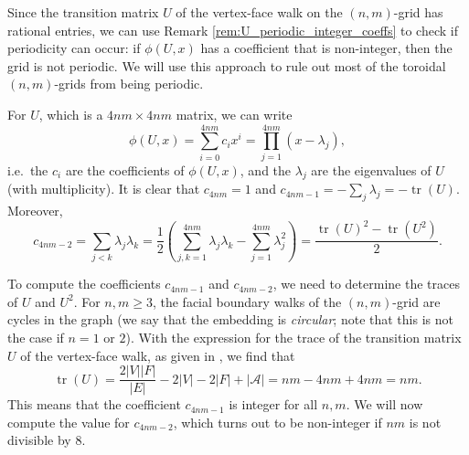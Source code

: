 \documentclass{article}
\numberwithin{equation}{section}
\DeclareMathOperator\tr{tr}
\newcommand\cA{{\mathcal A}}
\begin{document}
Since the transition matrix $U$ of the vertex-face walk on the $(n,m)$-grid has rational entries, we can use Remark \ref{rem:U_periodic_integer_coeffs} to check if periodicity can occur: if $\phi(U,x)$ has a coefficient that is non-integer, then the grid is not periodic. We will use this approach to rule out most of the toroidal $(n,m)$-grids from being periodic.

For $U$, which is a $4nm \times 4nm$ matrix, we can write
\[
\phi(U,x) = \sum_{i=0}^{4nm} c_i x^i = \prod_{j=1}^{4nm} (x - \lambda_j),
\]
i.e.\ the $c_i$ are the coefficients of $\phi(U,x)$, and the $\lambda_j$ are the eigenvalues of $U$ (with multiplicity). It is clear that $c_{4nm} = 1$ and $c_{4nm-1} = -\sum_{j}\lambda_j = -\tr(U)$. Moreover,
\begin{equation}
\label{eq:char_3rd_coeff}
c_{4nm-2} = \sum_{j < k}\lambda_j\lambda_k = \frac{1}{2}\left(\sum_{j,k=1}^{4nm} \lambda_j\lambda_k - \sum_{j=1}^{4nm}{\lambda_j^2}\right) = \frac{\tr(U)^2 - \tr(U^2)}{2}.
\end{equation}

To compute the coefficients $c_{4nm-1}$ and $c_{4nm-2}$, we need to determine the traces of $U$ and $U^2$. For $n,m \geq 3$, the facial boundary walks of the $(n,m)$-grid are cycles in the graph (we say that the embedding is \textsl{circular}; note that this is not the case if $n=1$ or $2$). With the expression for the trace of the transition matrix $U$ of the vertex-face walk, as given in \cite[Lemma 2.3]{Zha2021}, we find that
\begin{equation}
\label{eq:trace_U}
\tr(U) = \frac{2|V||F|}{|E|} - 2|V| - 2|F| + |\cA| = nm - 4nm + 4nm = nm.
\end{equation}
This means that the coefficient $c_{4nm-1}$ is integer for all $n,m$. We will now compute the value for $c_{4nm-2}$, which turns out to be non-integer if $nm$ is not divisible by $8$.
\end{document}
